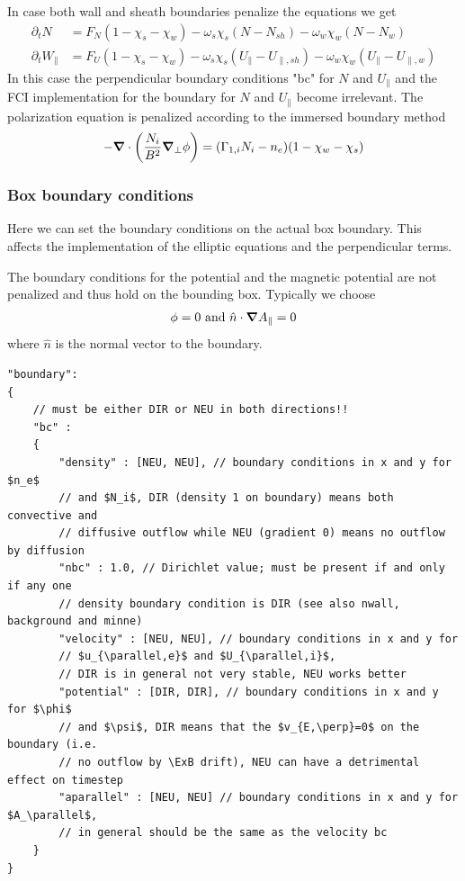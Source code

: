 \begin{tcolorbox}[title=Note]
    In case both wall and sheath boundaries penalize the equations we get
    \begin{subequations} \label{eq:sheath_wall_equations}
    \begin{align}
        \partial_t N &= F_N ( 1-\chi_s - \chi_w)  -\omega_s\chi_s (N-N_{sh}) -\omega_w\chi_w (N-N_{w})\\
        \partial_t W_\parallel &= F_U  ( 1 - \chi_s- \chi_w) -\omega_s \chi_s (U_\parallel - U_{\parallel,sh})-\omega_w\chi_w (U_\parallel- U_{\parallel,w})
    \end{align}
    \end{subequations}
    In this case the perpendicular boundary
    conditions "bc" for $N$ and $U_\parallel$ and the FCI implementation for the
    boundary for $N$ and $U_\parallel$ become irrelevant.
The polarization equation is penalized according to the immersed boundary method
\begin{align}
    -{\boldsymbol{\nabla}}\cdot\left( \frac{N_i}{B^2}{\boldsymbol{\nabla}}_{\perp} \phi \right) = (\Gamma_{1,i} N_i - n_e)(1-\chi_w -\chi_s)
\end{align}
\end{tcolorbox}

\subsubsection{Box boundary conditions}
Here we can set the boundary conditions on the actual box boundary.
This affects the implementation of the elliptic equations and the
perpendicular terms.

The boundary conditions for the potential and the magnetic potential are not
penalized and thus hold on the bounding box. Typically we choose
\begin{align}
\phi = 0
\text{ and }  \hat n \cdot{\boldsymbol{\nabla}} A_{\parallel} = 0
\end{align}
where $\hat n$ is the normal vector to the boundary.

\begin{verbatim}
"boundary":
{
    // must be either DIR or NEU in both directions!!
    "bc" :
    {
        "density" : [NEU, NEU], // boundary conditions in x and y for $n_e$
        // and $N_i$, DIR (density 1 on boundary) means both convective and
        // diffusive outflow while NEU (gradient 0) means no outflow by diffusion
        "nbc" : 1.0, // Dirichlet value; must be present if and only if any one
        // density boundary condition is DIR (see also nwall, background and minne)
        "velocity" : [NEU, NEU], // boundary conditions in x and y for
        // $u_{\parallel,e}$ and $U_{\parallel,i}$,
        // DIR is in general not very stable, NEU works better
        "potential" : [DIR, DIR], // boundary conditions in x and y for $\phi$
        // and $\psi$, DIR means that the $v_{E,\perp}=0$ on the boundary (i.e.
        // no outflow by \ExB drift), NEU can have a detrimental effect on timestep
        "aparallel" : [NEU, NEU] // boundary conditions in x and y for $A_\parallel$,
        // in general should be the same as the velocity bc
    }
}
\end{verbatim}

